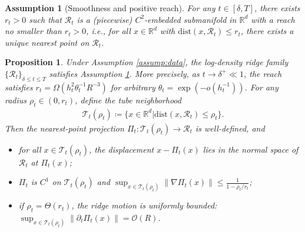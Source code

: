 \documentclass[10pt,a4paper]{amsart}
\newtheorem{assumption}{Assumption}
\newtheorem{proposition}{Proposition}
\newcommand{\mb}{\mathbb}
\newcommand{\mc}{\mathcal}
\begin{document}
\begin{assumption}[Smoothness and positive reach]\label{assump:ridge set} For any $t\in [\delta, T]$, there exists $r_t>0$ such that $\mc{R}_t$ is a (piecewise) $C^2$-embedded submanifold in $\mb{R}^d$ with a reach no smaller than $r_t>0$, i.e., for all $x\in \mb{R}^d$ with $\mathrm{dist}(x,\mc{R}_t)\le r_t$, there exists a unique nearest point on $\mc{R}_t$.
\end{assumption}

\begin{proposition}\label{prop:projection-regularity} Under Assumption \ref{assump:data}, the log-density ridge family $\{\mc{R}_t\}_{\delta\le t\le T}$ satisfies Assumption \ref{assump:ridge set}. More precisely, as $t\to \delta^+\ll 1$, the reach satisfies $r_t = \Omega(h_t^{2} \theta_t^{-1} R^{-3})$ for arbitrary $\theta_t=\exp(- o(h_{t}^{-1}) )$. For any radius $\rho_t\in (0,r_t)$, define the tube neighborhood
   \begin{align}\label{eq:tube ridge}
    \mc{T}_t(\rho_t)\coloneqq \{ x\in \mb{R}^d | \mathrm{dist}(x, \mc{R}_t)\le \rho_t \}.
\end{align} 
Then the nearest-point projection $\Pi_t: \mc{T}_t(\rho_t)\to \mc{R}_t$ is well-defined, and
\begin{itemize}
    \item [(1)] for all $ x\in \mc{T}_t(\rho_t)$, the displacement $ x-\Pi_t(x)$ lies in the normal space of $\mc{R}_t$ at $\Pi_t(x)$;
    \item [(2)]  $\Pi_t$ is $C^1$ on $\mc{T}_t(\rho_t)$ and $\sup_{x\in \mc{T}_t(\rho_t)} \| \nabla \Pi_t(x) \|\le \tfrac{1}{1-\rho_t/r_t}$;
    \item [(3)] if $\rho_t=\Theta(r_t)$, the ridge motion is uniformly bounded: $\sup_{x\in \mc{T}_t(\rho_t)}\| \partial_t\Pi_t(x)\| = \mc{O}\left( R\right)$.
\end{itemize}
\end{proposition}
\end{document}
